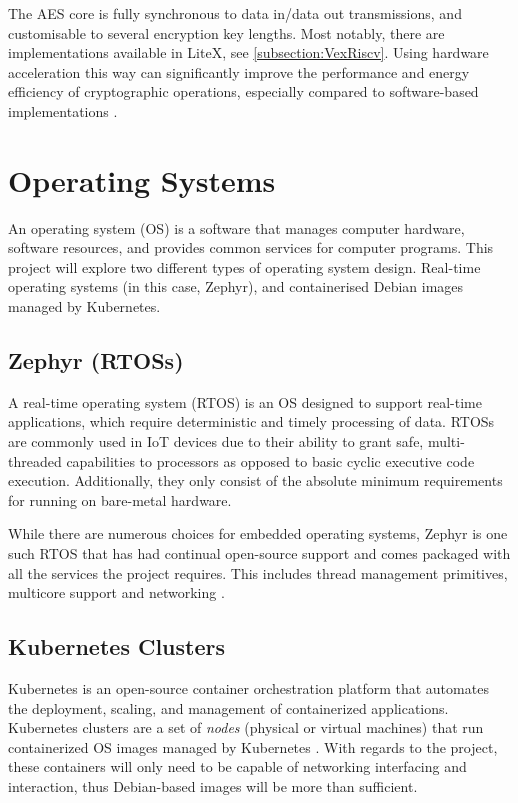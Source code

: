 The AES core is fully synchronous to data in/data out transmissions, and customisable to several encryption key lengths. Most notably, there are implementations available in LiteX, see \ref{subsection:VexRiscv}. Using hardware acceleration this way can significantly improve the performance and energy efficiency of cryptographic operations, especially compared to software-based implementations \cite{Stallings2019}.

\section{Operating Systems}
An operating system (OS) is a software that manages computer hardware, software resources, and provides common services for computer programs. This project will explore two different types of operating system design. Real-time operating systems (in this case, Zephyr), and containerised Debian images managed by Kubernetes. 

\subsection{Zephyr (RTOSs)}
A real-time operating system (RTOS) is an OS designed to support real-time applications, which require deterministic and timely processing of data. RTOSs are commonly used in IoT devices due to their ability to grant safe, multi-threaded capabilities to processors as opposed to basic cyclic executive code execution. Additionally, they only consist of the absolute minimum requirements for running on bare-metal hardware.

While there are numerous choices for embedded operating systems, Zephyr is one such RTOS that has had continual open-source support and comes packaged with all the services the project requires. This includes thread management primitives, multicore support and networking \cite{ZephyrProject}.

\subsection{Kubernetes Clusters}
Kubernetes is an open-source container orchestration platform that automates the deployment, scaling, and management of containerized applications. Kubernetes clusters are a set of \textit{nodes} (physical or virtual machines) that run containerized OS images managed by Kubernetes \cite{Burns2019}. With regards to the project, these containers will only need to be capable of networking interfacing and interaction, thus Debian-based images will be more than sufficient.

